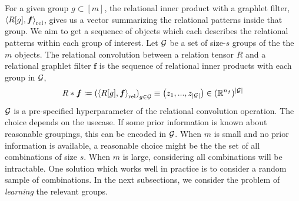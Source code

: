 For a given group $g \subset [m]$, the relational inner product with a graphlet filter, $\left \langle R[g], \bm{f} \right\rangle_\mathrm{rel}$, gives us a vector summarizing the relational patterns inside that group. We aim to get a sequence of objects which each describes the relational patterns within each group of interest. Let ${\mathcal{G}}$ be a set of size-$s$ groups of the the $m$ objects. The relational convolution between a relation tensor $R$ and a relational graphlet filter $\bm{f}$ is the sequence of relational inner products with each group in ${\mathcal{G}}$,
\begin{equation}
    \label{eq:relational_convolution}
    R \ast \bm{f} \coloneq \left( \left\langle R[g], \boldsymbol{f} \right\rangle_\mathrm{rel} \right)_{g \in {\mathcal{G}}} \equiv \left(z_1, ..., z_{\left\lvert{\mathcal{G}}\right\rvert}\right) \in (\mathbb{R}^{n_f})^{\left\lvert{\mathcal{G}}\right\rvert}
\end{equation}
${\mathcal{G}}$ is a pre-specified hyperparameter of the relational convolution operation. The choice depends on the usecase. If some prior information is known about reasonable groupings, this can be encoded in ${\mathcal{G}}$. When $m$ is small and no prior information is available, a reasonable choice might be the the set of all combinations of size $s$. When $m$ is large, considering all combinations will be intractable. One solution which works well in practice is to consider a random sample of combinations. In the next subsections, we consider the problem of \textit{learning} the relevant groups.


